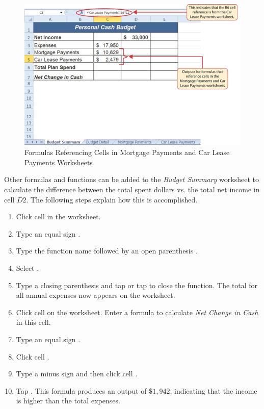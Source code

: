 \begin{figure}[H]
	\centering
	\includegraphics[width=\maxwidth{.95\linewidth}]{gfx/ch02_fig37}
	\caption{Formulas Referencing Cells in Mortgage Payments and Car Lease Payments Worksheets}
	\label{02:fig37}
\end{figure}

Other formulas and functions can be added to the \textit{Budget Summary} worksheet to calculate the difference between the total spent dollars vs. the total net income in cell $ D2 $. The following steps explain how this is accomplished.

\begin{enumbox}
	\begin{enumerate}
		\item Click cell  in the  worksheet.
		\item Type an equal sign \fmtTyping{=}.
		\item Type the function name  followed by an open parenthesis \fmtTyping{(}.
		\item Select .
		\item Type a closing parenthesis \fmtTyping{)} and tap  or tap  to close the function. The total for all annual expenses now appears on the worksheet.
		\item Click cell  on the  worksheet. Enter a formula to calculate \textit{Net Change in Cash} in this cell.
		\item Type an equal sign \fmtTyping{=}.
		\item Click cell .
		\item Type a minus sign \fmtTyping{-} and then click cell .
		\item Tap . This formula produces an output of $ \$1,942 $, indicating that the income is higher than the total expenses.
	\end{enumerate}
\end{enumbox}

